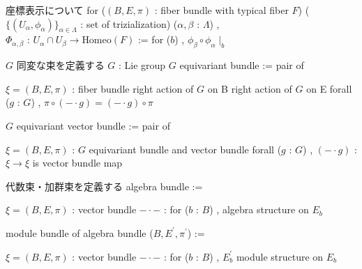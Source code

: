 \begin{Definition}
\itemnote 座標表示について
\itemdefi
  for (\((B , E , \pi)\) : fiber bundle with typical fiber \(F\)) (\(\{(U_\alpha , \phi_\alpha)\}_{\alpha \in \Lambda}\) : set of trizialization) (\(\alpha , \beta\) : \(\Lambda\)) , \\
  \(\Phi_{\alpha , \beta}\) : \(U_\alpha \cap U_\beta \to \text{Homeo}(F)\) := for (\(b\)) , \(\phi_\beta \circ \phi_\alpha \mid_b\)
\end{Definition}

\begin{Definition}
\itemnote \(G\) 同変な束を定義する
\itemwhen \(G\) : Lie group
\itemdefi
  \(G\) equivariant bundle := pair of
  \begin{itemize}
    \itemenum \(\xi = (B , E , \pi)\) : fiber bundle
    \itemenum right action of \(G\) on B
    \itemenum right action of \(G\) on E
    \itemwith forall (\(g\) : \(G\)) , \(\pi \circ (- \cdot g) = (- \cdot g) \circ \pi\)
  \end{itemize}
\itemdefi
  \(G\) equivariant vector bundle := pair of
  \begin{itemize}
    \itemenum \(\xi = (B , E , \pi)\) : \(G\) equivariant bundle and vector bundle
    \itemwith
      forall (\(g\) : \(G\)) , \((- \cdot g)\) : \(\xi \to \xi\) is vector bundle map
  \end{itemize}
\end{Definition}

\begin{Definition}
\itemnote 代数束・加群束を定義する
\itemdefi 
  algebra bundle :=
  \begin{itemize}
    \itemenum \(\xi = (B , E , \pi)\) : vector bundle
    \itemenum \(- \cdot -\) :
      for (\(b\) : \(B\)) , algebra structure on \(E_b\)
    \itemwith {}
  \end{itemize}
  module bundle of algebra bundle (\(B , E^{\prime} , \pi^{\prime}\)) :=
  \begin{itemize}
    \itemenum \(\xi = (B , E , \pi)\) : vector bundle
    \itemenum \(- \cdot -\) :
      for (\(b\) : \(B\)) , \(E^{\prime}_b\) module structure on \(E_b\) 
    \itemwith {}
  \end{itemize}
\end{Definition}